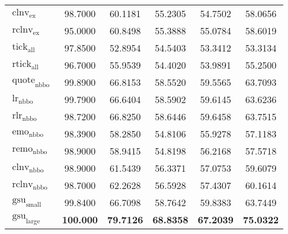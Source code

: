 \begin{table}[H]
\begin{tabular}{@{}lSSSSS@{}}
        $\operatorname{clnv}_{\mathrm{ex}}$    & 98.7000           & 60.1181                            & 55.2305           & 54.7502           & 58.0656           \\
        $\operatorname{rclnv}_{\mathrm{ex}}$   & 95.0000           & 60.8498                            & 55.3888           & 55.0784           & 58.6019           \\ \midrule
        $\operatorname{tick}_{\mathrm{all}}$   & 97.8500           & 52.8954                            & 54.5403           & 53.3412           & 53.3134           \\
        $\operatorname{rtick}_{\mathrm{all}}$  & 96.7000           & 55.9539                            & 54.4020           & 53.9891           & 55.2500           \\ \midrule
        $\operatorname{quote}_{\mathrm{nbbo}}$ & 99.8900           & 66.8153                            & 58.5520           & 59.5565           & 63.7093           \\
        $\operatorname{lr}_{\mathrm{nbbo}}$    & 99.7900           & 66.6404                            & 58.5902           & 59.6145           & 63.6236           \\
        $\operatorname{rlr}_{\mathrm{nbbo}}$   & 98.7200           & 66.8250                            & 58.6446           & 59.6458           & 63.7515           \\
        $\operatorname{emo}_{\mathrm{nbbo}}$   & 98.3900           & 58.2850                            & 54.8106           & 55.9278           & 57.1183           \\
        $\operatorname{remo}_{\mathrm{nbbo}}$  & 98.9000           & 58.9415                            & 54.8198           & 56.2168           & 57.5718           \\
        $\operatorname{clnv}_{\mathrm{nbbo}}$  & 98.9000           & 61.5439                            & 56.3371           & 57.0753           & 59.6079           \\
        $\operatorname{rclnv}_{\mathrm{nbbo}}$ & 98.7000           & 62.2628                            & 56.5928           & 57.4307           & 60.1614           \\ \midrule
        $\operatorname{gsu}_{\mathrm{small}}$  & 99.8400           & 66.7098                            & 58.7642           & 59.8383           & 63.7449           \\
        $\operatorname{gsu}_{\mathrm{large}}$  & \bfseries 100.000 & \bfseries 79.7126                  & \bfseries 68.8358 & \bfseries 67.2039 & \bfseries 75.0322 \\
        \bottomrule
    \end{tabular}
\end{table}

